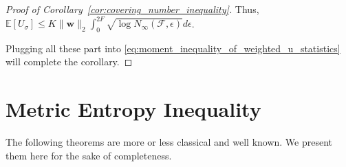 \documentclass[letterpaper]{article} %
\def\DoubleColumn{}
\def\DoubleColumnEnd{}
\def\SingleColumn{}
\def\SingleColumnEnd{}
\newcommand{\E}{\mathbb{E}}
\newcommand{\weight}{\mathbf{w}}
\newcommand{\rademacher}{\sigma}
\newcommand{\pair}[1]{(#1)}
\newcommand{\lnorm}{\mathbb{L}}
\begin{document}
\begin{proof}[Proof of Corollary~\ref{cor:covering_number_inequality}]
Thus, $\E[U_\rademacher]\le K\|\weight{}\|_2\int_0^{2F}\sqrt{\log N_\infty(\mathcal F,\epsilon)}d\epsilon$.

Plugging all these part into \eqref{eq:moment_inequality_of_weighted_u_statistics} will complete the corollary.
\end{proof}

\section{Metric Entropy Inequality} %
\label{sub:metric_entropy_inequality}

The following theorems are more or less classical and well known. We present them here for the sake of completeness.
\end{document}
